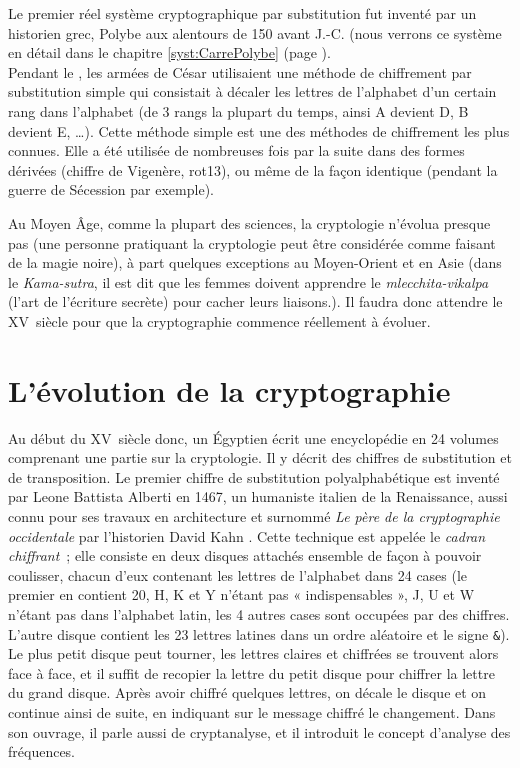 Le premier réel système cryptographique par substitution fut inventé
par un historien grec, Polybe aux alentours de 150 avant J.-C. (nous
verrons ce système en détail dans le chapitre \ref{syst:CarrePolybe} (page
\pageref{syst:CarrePolybe}). \\

\label{syst:ChiffreCesar}
Pendant le , les armées de César utilisaient une méthode de
chiffrement par substitution simple qui consistait à décaler les
lettres de l'alphabet d'un certain rang dans l'alphabet (de 3 rangs la
plupart du temps, ainsi A devient D, B devient E, \dots). Cette 
méthode simple est une des méthodes de chiffrement les plus
connues. Elle a été
utilisée de nombreuses fois par la suite dans des formes dérivées (chiffre de
Vigenère, rot13), ou même
de la façon identique (pendant la guerre de Sécession par exemple).

Au Moyen Âge, comme la plupart des sciences, la cryptologie n'évolua
presque pas (une personne pratiquant la cryptologie peut être
considérée comme faisant de la magie noire), à part quelques exceptions
au Moyen-Orient et en Asie (dans le \emph{Kama-sutra}, il est dit que les
femmes doivent apprendre le \emph{mlecchita-vikalpa} (l'art de
l'écriture secrète) pour cacher leurs liaisons.). Il faudra donc
attendre le XV\ieme~siècle pour que la cryptographie commence
réellement à évoluer. \\

\section{L'évolution de la cryptographie}
Au début du XV\ieme~siècle donc, un Égyptien écrit une encyclopédie
en 24 volumes comprenant une partie sur la cryptologie. Il y décrit des
chiffres de substitution et de transposition. Le premier chiffre de
substitution polyalphabétique
est inventé par Leone Battista Alberti en 1467, un humaniste italien
de la Renaissance, aussi connu pour ses travaux en architecture et
surnommé \emph{Le père de la cryptographie occidentale} par
l'historien David Kahn \cite{Codebreakers}. Cette technique est appelée
le \emph{cadran chiffrant}\label{syst:CadranChiffrant}~; elle consiste
en deux disques attachés ensemble de façon à pouvoir coulisser,
chacun d'eux contenant les lettres de l'alphabet dans 24 cases (le premier
en contient 20, H, K et Y n'étant pas « indispensables », J, U et W
n'étant pas dans l'alphabet latin, les 4 autres cases sont occupées
par des chiffres. L'autre disque contient les 23 lettres latines dans
un ordre aléatoire et le signe \texttt{\&}). Le plus petit disque peut tourner,
les lettres claires et chiffrées se trouvent alors face à face, et il
suffit de recopier la lettre du petit disque pour chiffrer la lettre
du grand disque. Après avoir chiffré quelques lettres, on décale le
disque et on continue ainsi de suite, en indiquant sur le message
chiffré le changement. Dans son ouvrage, il parle aussi de
cryptanalyse, et il introduit le concept d'analyse des
fréquences. \\

